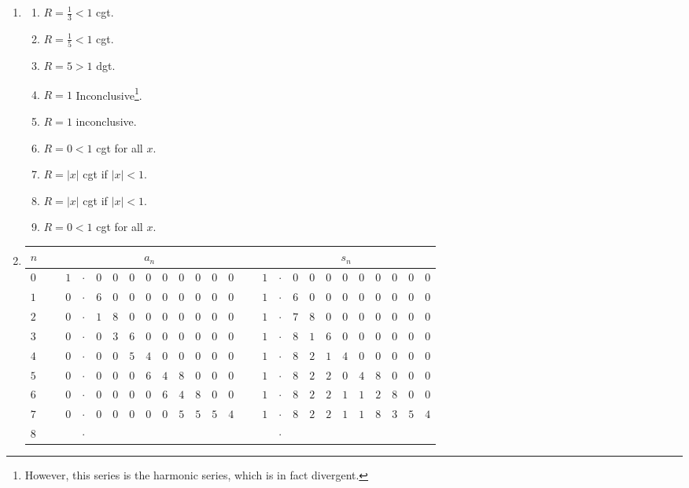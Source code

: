 \documentclass[11pt,a4paper,titlepage,oneside,openany]{article}
\numberwithin{equation}{section}
\numberwithin{algorithm}{section}
\numberwithin{figure}{section}
\numberwithin{table}{section}
\begin{document}
\begin{enumerate}
\item
  \begin{multicols}{3}
    \begin{enumerate}
      \item $R=\frac{1}{3}<1$ cgt.
      \item $R=\frac{1}{5}<1$ cgt.
      \item $R=5>1$ dgt.
      \item $R=1$ Inconclusive\footnote{However, this series is the harmonic series, which is in fact divergent.}.
      \item $R=1$ inconclusive.
      \item $R=0<1$ cgt for all $x$.
      \item $R=|x|$ cgt if $|x|<1$.
      \item $R=|x|$ cgt if $|x|<1$.
      \item $R=0<1$ cgt for all $x$.
    \end{enumerate}        
  \end{multicols}

\item
\hfill

\begin{tabular}{|l|c|c:c:c:c:c:c:c:c:c:c:c|c|c:c:c:c:c:c:c:c:c:c:c|}\hline
$n$ & \ &  & \ &  \\\hline
$0$ & \ &
$1$ & $\cdot$ & $0$ & $0$ & $0$ & $0$ & $0$ & $0$ & $0$ & $0$ & $0$ & \ &
$1$ & $\cdot$ & $0$ & $0$ & $0$ & $0$ & $0$ & $0$ & $0$ & $0$ & $0$ \\ \hline
$1$ & \ &
$0$ & $\cdot$ & $6$ & $0$ & $0$ & $0$ & $0$ & $0$ & $0$ & $0$ & $0$ & \ &
$1$ & $\cdot$ & $6$ & $0$ & $0$ & $0$ & $0$ & $0$ & $0$ & $0$ & $0$ \\ \hline
$2$ & \ &
$0$ & $\cdot$ & $1$ & $8$ & $0$ & $0$ & $0$ & $0$ & $0$ & $0$ & $0$ & \ &
$1$ & $\cdot$ & $7$ & $8$ & $0$ & $0$ & $0$ & $0$ & $0$ & $0$ & $0$ \\ \hline
$3$ & \ &
$0$ & $\cdot$ & $0$ & $3$ & $6$ & $0$ & $0$ & $0$ & $0$ & $0$ & $0$ & \ &
$1$ & $\cdot$ & $8$ & $1$ & $6$ & $0$ & $0$ & $0$ & $0$ & $0$ & $0$ \\ \hline
$4$ & \ &
$0$ & $\cdot$ & $0$ & $0$ & $5$ & $4$ & $0$ & $0$ & $0$ & $0$ & $0$ & \ &
$1$ & $\cdot$ & $8$ & $2$ & $1$ & $4$ & $0$ & $0$ & $0$ & $0$ & $0$ \\ \hline
$5$ & \ &
$0$ & $\cdot$ & $0$ & $0$ & $0$ & $6$ & $4$ & $8$ & $0$ & $0$ & $0$ & \ &
$1$ & $\cdot$ & $8$ & $2$ & $2$ & $0$ & $4$ & $8$ & $0$ & $0$ & $0$ \\ \hline
$6$ & \ &
$0$ & $\cdot$ & $0$ & $0$ & $0$ & $0$ & $6$ & $4$ & $8$ & $0$ & $0$ & \ &
$1$ & $\cdot$ & $8$ & $2$ & $2$ & $1$ & $1$ & $2$ & $8$ & $0$ & $0$ \\ \hline
$7$ & \ &
$0$ & $\cdot$ & $0$ & $0$ & $0$ & $0$ & $0$ & $5$ & $5$ & $5$ & $4$ & \ &
$1$ & $\cdot$ & $8$ & $2$ & $2$ & $1$ & $1$ & $8$ & $3$ & $5$ & $4$ \\ \hline
$8$ & \ &
 & $\cdot$ &  &  &  &  &  &  &  &  &  & \ &
 & $\cdot$ &  &  &  &  &  &  &  &  &  \\ \hline


\end{tabular}
\end{enumerate}
\end{document}
